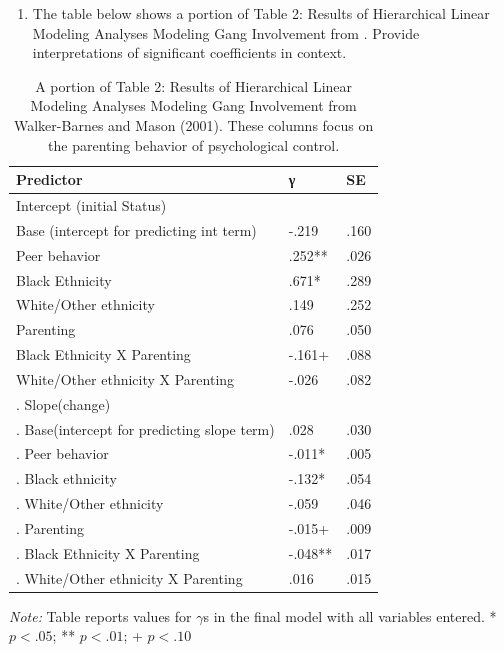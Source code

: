 \documentclass[
]{krantz}
\providecommand{\tightlist}{%
  \setlength{\itemsep}{0pt}\setlength{\parskip}{0pt}}
\begin{document}
\begin{enumerate}
\def\labelenumi{\arabic{enumi}.}
\setcounter{enumi}{4}
\tightlist
\item
  The table below shows a portion of Table 2: Results of Hierarchical Linear Modeling Analyses Modeling Gang Involvement from \citet{Walker-Barnes2001}. Provide interpretations of significant coefficients in context.
\end{enumerate}

\begin{table}[t]

\caption{\label{tab:table4chp9}A portion of Table 2: Results of Hierarchical Linear Modeling Analyses Modeling Gang Involvement from Walker-Barnes and Mason (2001).  These columns focus on the parenting behavior of psychological control.}
\centering
\begin{tabular}{lll}
\toprule
Predictor & γ & SE\\
\midrule
Intercept (initial Status) &  & \\
Base (intercept for predicting int term) & -.219 & .160\\
Peer behavior & .252** & .026\\
Black Ethnicity & .671* & .289\\
White/Other ethnicity & .149 & .252\\
\addlinespace
Parenting & .076 & .050\\
Black Ethnicity X Parenting & -.161+ & .088\\
White/Other ethnicity X Parenting & -.026 & .082\\
.     Slope(change) &  & \\
.     Base(intercept for predicting slope term) & .028 & .030\\
\addlinespace
.     Peer behavior & -.011* & .005\\
.     Black ethnicity & -.132* & .054\\
.     White/Other ethnicity & -.059 & .046\\
.     Parenting & -.015+ & .009\\
.     Black Ethnicity X Parenting & -.048** & .017\\
\addlinespace
.     White/Other ethnicity X Parenting & .016 & .015\\
\bottomrule
\end{tabular}
\end{table}

\emph{Note:} Table reports values for \(\gamma\)s in the final model with all variables entered. * \(p<.05\); ** \(p<.01\); + \(p<.10\)
\end{document}
